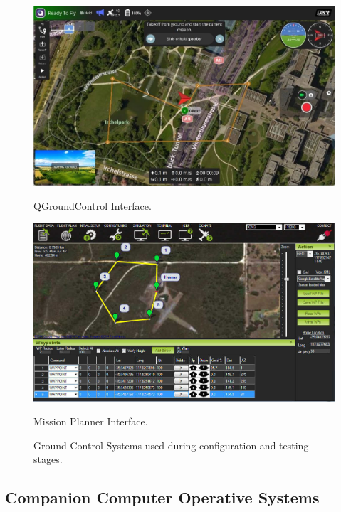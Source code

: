 \begin{figure}[h!]
    \centering
    \begin{minipage}{0.48\textwidth}
        \centering
        \includegraphics[width=\textwidth]{pictures/qgc_interface.jpg} %
        \caption{QGroundControl Interface.}
        \label{fig:qgc}
    \end{minipage}
    \hfill
    \begin{minipage}{0.48\textwidth}
        \centering
        \includegraphics[width=\textwidth]{pictures/mission_planner.jpg} %
        \caption{Mission Planner Interface.}
        \label{fig:mission_planner}
    \end{minipage}
    \caption{Ground Control Systems used during configuration and testing stages.}
    \label{fig:gcs}
\end{figure}



\subsection{Companion Computer Operative Systems} 

